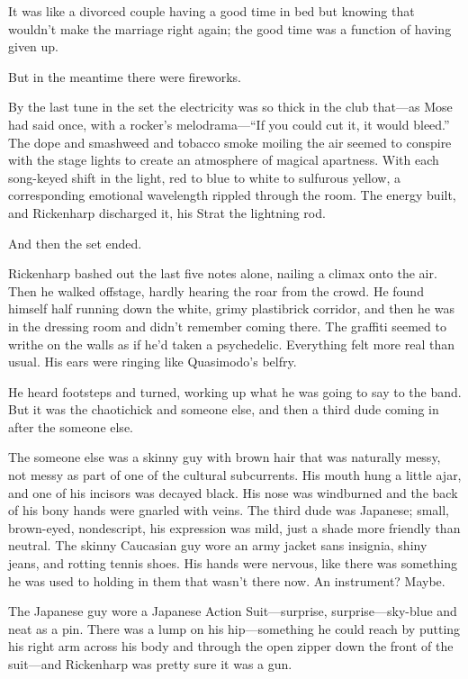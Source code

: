 It was like a divorced couple having a good time in bed but knowing that wouldn’t make the marriage right again; the good time was a function of having given up.

But in the meantime there were fireworks.

By the last tune in the set the electricity was so thick in the club that—as Mose had said once, with a rocker’s melodrama—“If you could cut it, it would bleed.” The dope and smashweed and tobacco smoke moiling the air seemed to conspire with the stage lights to create an atmosphere of magical apartness. With each song-keyed shift in the light, red to blue to white to sulfurous yellow, a corresponding emotional wavelength rippled through the room. The energy built, and Rickenharp discharged it, his Strat the lightning rod.

And then the set ended.

Rickenharp bashed out the last five notes alone, nailing a climax onto the air. Then he walked offstage, hardly hearing the roar from the crowd. He found himself half running down the white, grimy plastibrick corridor, and then he was in the dressing room and didn’t remember coming there. The graffiti seemed to writhe on the walls as if he’d taken a psychedelic. Everything felt more real than usual. His ears were ringing like Quasimodo’s belfry.

He heard footsteps and turned, working up what he was going to say to the band. But it was the chaotichick and someone else, and then a third dude coming in after the someone else.

The someone else was a skinny guy with brown hair that was naturally messy, not messy as part of one of the cultural subcurrents. His mouth hung a little ajar, and one of his incisors was decayed black. His nose was windburned and the back of his bony hands were gnarled with veins. The third dude was Japanese; small, brown-eyed, nondescript, his expression was mild, just a shade more friendly than neutral. The skinny Caucasian guy wore an army jacket sans insignia, shiny jeans, and rotting tennis shoes. His hands were nervous, like there was something he was used to holding in them that wasn’t there now. An instrument? Maybe.

The Japanese guy wore a Japanese Action Suit—surprise, surprise—sky-blue and neat as a pin. There was a lump on his hip—something he could reach by putting his right arm across his body and through the open zipper down the front of the suit—and Rickenharp was pretty sure it was a gun.

